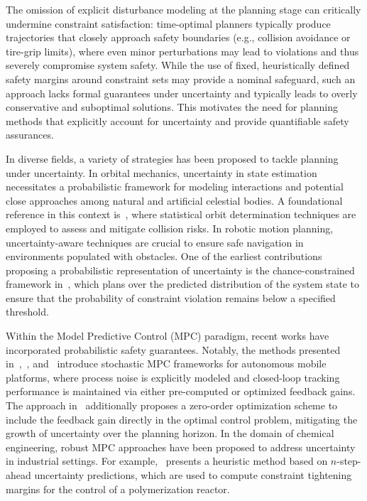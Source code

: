 The omission of explicit disturbance modeling at the planning stage can critically undermine constraint satisfaction: time-optimal planners typically produce trajectories that closely approach safety boundaries (e.g., collision avoidance or tire-grip limits), where even minor perturbations may lead to violations and thus severely compromise system safety.
While the use of fixed, heuristically defined safety margins around constraint sets may provide a nominal safeguard, such an approach lacks formal guarantees under uncertainty and typically leads to overly conservative and suboptimal solutions. This motivates the need for planning methods that explicitly account for uncertainty and provide quantifiable safety assurances.

In diverse fields, a variety of strategies has been proposed to tackle planning under uncertainty.
In orbital mechanics, uncertainty in state estimation necessitates a probabilistic framework for modeling interactions and potential close approaches among natural and artificial celestial bodies.
A foundational reference in this context is~\cite{Tapley:StatisticalOrbitDetermination:2004}, where statistical orbit determination techniques are employed to assess and mitigate collision risks. In robotic motion planning, uncertainty-aware techniques are crucial to ensure safe navigation in environments populated with obstacles. One of the earliest contributions proposing a probabilistic representation of uncertainty is the chance-constrained framework in~\cite{Blackmore:ChanceConstrainedOptimalPath:2011}, which plans over the predicted distribution of the system state to ensure that the probability of constraint violation remains below a specified threshold.

Within the Model Predictive Control (MPC) paradigm, recent works have incorporated probabilistic safety guarantees. Notably, the methods presented in~\cite{Gao:CollisionfreeMotionPlanning:2023},~\cite{Zhang:RobustifiedTimeoptimalPointtopoint:2025}, and~\cite{Zhang:RobustifiedTimeoptimalCollisionfree:2024} introduce stochastic MPC frameworks for autonomous mobile platforms, where process noise is explicitly modeled and closed-loop tracking performance is maintained via either pre-computed or optimized feedback gains. The approach in~\cite{Gao:CollisionfreeMotionPlanning:2023} additionally proposes a zero-order optimization scheme to include the feedback gain directly in the optimal control problem, mitigating the growth of uncertainty over the planning horizon.
In the domain of chemical engineering, robust MPC approaches have been proposed to address uncertainty in industrial settings. For example,~\cite{Krog:SimpleFastRobust:2024} presents a heuristic method based on $n$-step-ahead uncertainty predictions, which are used to compute constraint tightening margins for the control of a polymerization reactor.

